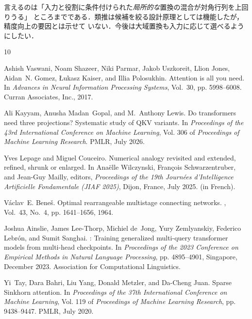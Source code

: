 \documentclass{nlp2026}
\begin{document}
言えるのは「入力と役割に条件付けられた\emph{局所的な}置換の混合が対角行列を上回りうる」
ところまでである．類推は候補を絞る設計原理としては機能したが，精度向上の要因とは示せて
いない．今後は大域置換も入力に応じて選べるようにしたい．

\clearpage
\begin{thebibliography}{10}

Ashish Vaswani, Noam Shazeer, Niki Parmar, Jakob Uszkoreit, Llion Jones, Aidan~N. Gomez, {\L}ukasz Kaiser, and Illia Polosukhin.
\newblock Attention is all you need.
\newblock In {\em Advances in Neural Information Processing Systems}, Vol.~30, pp. 5998--6008. Curran Associates, Inc., 2017.

Ali Kayyam, Anusha Madan~Gopal, and M.~Anthony Lewis.
\newblock Do transformers need three projections? {S}ystematic study of {QKV} variants.
\newblock In {\em Proceedings of the 43rd International Conference on Machine Learning}, Vol. 306 of {\em Proceedings of Machine Learning Research}. PMLR, July 2026.

Yves Lepage and Miguel Couceiro.
\newblock Numerical analogy revisited and extended, refined, shrunk or enlarged.
\newblock In Ana{\"e}lle Wilczynski, Fran{\c{c}}ois Schwarzentruber, and Jean-Guy Mailly, editors, {\em Proceedings of the 19th Journ{\'e}es d'Intelligence Artificielle Fondamentale ({JIAF} 2025)}, Dijon, France, July 2025.
\newblock (in French).

V{\'a}clav~E. Bene{\v{s}}.
\newblock Optimal rearrangeable multistage connecting networks.
, Vol.~43, No.~4, pp. 1641--1656, 1964.

Joshua Ainslie, James Lee-Thorp, Michiel de~Jong, Yury Zemlyanskiy, Federico Lebr{\'o}n, and Sumit Sanghai.
: Training generalized multi-query transformer models from multi-head checkpoints.
\newblock In {\em Proceedings of the 2023 Conference on Empirical Methods in Natural Language Processing}, pp. 4895--4901, Singapore, December 2023. Association for Computational Linguistics.

Yi~Tay, Dara Bahri, Liu Yang, Donald Metzler, and Da-Cheng Juan.
\newblock Sparse {S}inkhorn attention.
\newblock In {\em Proceedings of the 37th International Conference on Machine Learning}, Vol. 119 of {\em Proceedings of Machine Learning Research}, pp. 9438--9447. PMLR, July 2020.


\end{thebibliography}
\end{document}
